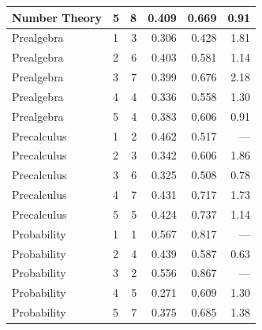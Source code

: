 \documentclass{article}
\begin{document}
\begin{table}[h]
\begin{tabular}{llrrrr}
    Number Theory   & 5 &  8 & 0.409 & 0.669 & 0.91 \\
    \midrule
    Prealgebra      & 1 &  3 & 0.306 & 0.428 & 1.81 \\
    Prealgebra      & 2 &  6 & 0.403 & 0.581 & 1.14 \\
    Prealgebra      & 3 &  7 & 0.399 & 0.676 & 2.18 \\
    Prealgebra      & 4 &  4 & 0.336 & 0.558 & 1.30 \\
    Prealgebra      & 5 &  4 & 0.383 & 0.606 & 0.91 \\
    \midrule
    Precalculus     & 1 &  2 & 0.462 & 0.517 & --- \\
    Precalculus     & 2 &  3 & 0.342 & 0.606 & 1.86 \\
    Precalculus     & 3 &  6 & 0.325 & 0.508 & 0.78 \\
    Precalculus     & 4 &  7 & 0.431 & 0.717 & 1.73 \\
    Precalculus     & 5 &  5 & 0.424 & 0.737 & 1.14 \\
    \midrule
    Probability     & 1 &  1 & 0.567 & 0.817 & --- \\
    Probability     & 2 &  4 & 0.439 & 0.587 & 0.63 \\
    Probability     & 3 &  2 & 0.556 & 0.867 & --- \\
    Probability     & 4 &  5 & 0.271 & 0.609 & 1.30 \\
    Probability     & 5 &  7 & 0.375 & 0.685 & 1.38 \\
    \bottomrule
  \end{tabular}
\end{table}
\end{document}
